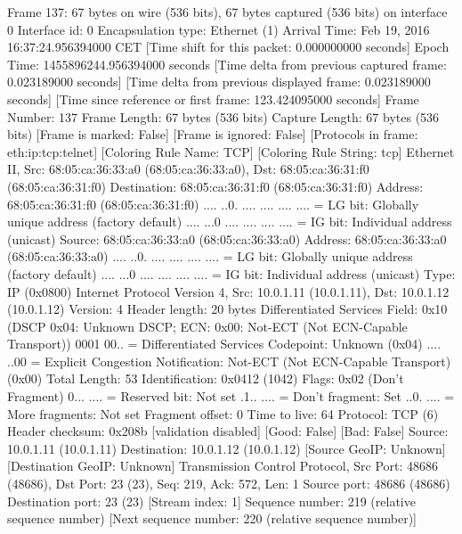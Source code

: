 Frame 137: 67 bytes on wire (536 bits), 67 bytes captured (536 bits) on interface 0
    Interface id: 0
    Encapsulation type: Ethernet (1)
    Arrival Time: Feb 19, 2016 16:37:24.956394000 CET
    [Time shift for this packet: 0.000000000 seconds]
    Epoch Time: 1455896244.956394000 seconds
    [Time delta from previous captured frame: 0.023189000 seconds]
    [Time delta from previous displayed frame: 0.023189000 seconds]
    [Time since reference or first frame: 123.424095000 seconds]
    Frame Number: 137
    Frame Length: 67 bytes (536 bits)
    Capture Length: 67 bytes (536 bits)
    [Frame is marked: False]
    [Frame is ignored: False]
    [Protocols in frame: eth:ip:tcp:telnet]
    [Coloring Rule Name: TCP]
    [Coloring Rule String: tcp]
Ethernet II, Src: 68:05:ca:36:33:a0 (68:05:ca:36:33:a0), Dst: 68:05:ca:36:31:f0 (68:05:ca:36:31:f0)
    Destination: 68:05:ca:36:31:f0 (68:05:ca:36:31:f0)
        Address: 68:05:ca:36:31:f0 (68:05:ca:36:31:f0)
        .... ..0. .... .... .... .... = LG bit: Globally unique address (factory default)
        .... ...0 .... .... .... .... = IG bit: Individual address (unicast)
    Source: 68:05:ca:36:33:a0 (68:05:ca:36:33:a0)
        Address: 68:05:ca:36:33:a0 (68:05:ca:36:33:a0)
        .... ..0. .... .... .... .... = LG bit: Globally unique address (factory default)
        .... ...0 .... .... .... .... = IG bit: Individual address (unicast)
    Type: IP (0x0800)
Internet Protocol Version 4, Src: 10.0.1.11 (10.0.1.11), Dst: 10.0.1.12 (10.0.1.12)
    Version: 4
    Header length: 20 bytes
    Differentiated Services Field: 0x10 (DSCP 0x04: Unknown DSCP; ECN: 0x00: Not-ECT (Not ECN-Capable Transport))
        0001 00.. = Differentiated Services Codepoint: Unknown (0x04)
        .... ..00 = Explicit Congestion Notification: Not-ECT (Not ECN-Capable Transport) (0x00)
    Total Length: 53
    Identification: 0x0412 (1042)
    Flags: 0x02 (Don't Fragment)
        0... .... = Reserved bit: Not set
        .1.. .... = Don't fragment: Set
        ..0. .... = More fragments: Not set
    Fragment offset: 0
    Time to live: 64
    Protocol: TCP (6)
    Header checksum: 0x208b [validation disabled]
        [Good: False]
        [Bad: False]
    Source: 10.0.1.11 (10.0.1.11)
    Destination: 10.0.1.12 (10.0.1.12)
    [Source GeoIP: Unknown]
    [Destination GeoIP: Unknown]
Transmission Control Protocol, Src Port: 48686 (48686), Dst Port: 23 (23), Seq: 219, Ack: 572, Len: 1
    Source port: 48686 (48686)
    Destination port: 23 (23)
    [Stream index: 1]
    Sequence number: 219    (relative sequence number)
    [Next sequence number: 220    (relative sequence number)]
